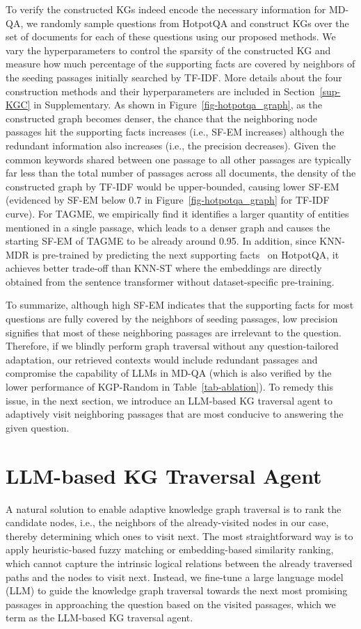 \newpage
To verify the constructed KGs indeed encode the necessary information for MD-QA, we randomly sample questions from HotpotQA and construct KGs over the set of documents for each of these questions using our proposed methods. We vary the hyperparameters to control the sparsity of the constructed KG and measure how much percentage of the supporting facts are covered by neighbors of the seeding passages initially searched by TF-IDF. More details about the four construction methods and their hyperparameters are included in Section~\ref{sup-KGC} in Supplementary. As shown in Figure~\ref{fig-hotpotqa_graph}, as the constructed graph becomes denser, the chance that the neighboring node passages hit the supporting facts increases (i.e., SF-EM increases) although the redundant information also increases (i.e., the precision decreases). Given the common keywords shared between one passage to all other passages are typically far less than the total number of passages across all documents, the density of the constructed graph by TF-IDF would be upper-bounded, causing lower SF-EM (evidenced by SF-EM below 0.7 in Figure~\ref{fig-hotpotqa_graph} for TF-IDF curve). For TAGME, we empirically find it identifies a larger quantity of entities mentioned in a single passage, which leads to a denser graph and causes the starting SF-EM of TAGME to be already around 0.95. In addition, since KNN-MDR is pre-trained by predicting the next supporting facts~\cite{xiong2020answering} on HotpotQA, it achieves better trade-off than KNN-ST where the embeddings are directly obtained from the sentence transformer without dataset-specific pre-training. 


To summarize, although high SF-EM indicates that the supporting facts for most questions are fully covered by the neighbors of seeding passages, low precision signifies that most of these neighboring passages are irrelevant to the question. Therefore, if we blindly perform graph traversal without any question-tailored adaptation, our retrieved contexts would include redundant passages and compromise the capability of LLMs in MD-QA (which is also verified by the lower performance of KGP-Random in Table~\ref{tab-ablation}). To remedy this issue, in the next section, we introduce an LLM-based KG traversal agent to adaptively visit neighboring passages that are most conducive to answering the given question.


\section{LLM-based KG Traversal Agent}\label{sec-graphwalker}
A natural solution to enable adaptive knowledge graph traversal is to rank the candidate nodes, i.e., the neighbors of the already-visited nodes in our case, thereby determining which ones to visit next. The most straightforward way is to apply heuristic-based fuzzy matching or embedding-based similarity ranking, which cannot capture the intrinsic logical relations between the already traversed paths and the nodes to visit next. Instead, we fine-tune a large language model (LLM) to guide the knowledge graph traversal towards the next most promising passages in approaching the question based on the visited passages, which we term as the LLM-based KG traversal agent.


